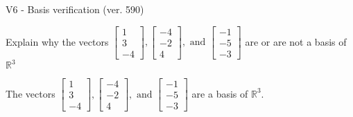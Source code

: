 \begin{exercise}
  \begin{exerciseTitle}V6 - Basis verification (ver. 590)\end{exerciseTitle}
  \begin{exerciseStatement}
    Explain why the vectors \(\left[\begin{array}{r}
1 \\
3 \\
-4
\end{array}\right] , \left[\begin{array}{r}
-4 \\
-2 \\
4
\end{array}\right] , \text{ and } \left[\begin{array}{r}
-1 \\
-5 \\
-3
\end{array}\right]\) are or are not a basis of \(\mathbb{R}^3\)	


  \end{exerciseStatement}
  \begin{exerciseAnswer}
   The vectors \(\left[\begin{array}{r}
1 \\
3 \\
-4
\end{array}\right] , \left[\begin{array}{r}
-4 \\
-2 \\
4
\end{array}\right] , \text{ and } \left[\begin{array}{r}
-1 \\
-5 \\
-3
\end{array}\right]\) 
  	 are  a basis of \(\mathbb{R}^3\).
  


  \end{exerciseAnswer}
\end{exercise}